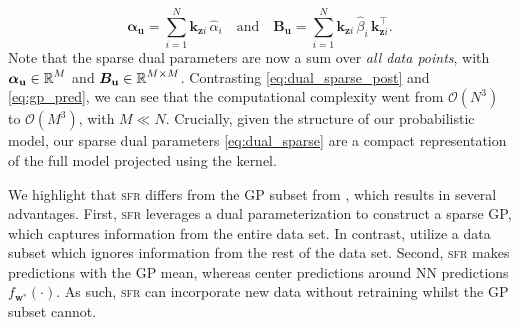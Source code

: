 \documentclass{article}
\newcommand{\our}{\textsc{sfr}\xspace}
\newcommand{\dataset}{\ensuremath{\mathcal{D}}}
\newcommand{\mathbold}[1]{\bm{#1}}
\newcommand{\mbf}[1]{\mathbf{#1}}
\newcommand{\T}{\top}
\newcommand{\valpha}[0]{\mathbold{\alpha}}
\newcommand{\MBeta}[0]{\mathbold{B}}
\newcommand{\vz}{\mbf{z}}
\newcommand{\vf}{\mbf{f}}
\newcommand{\vu}{\mbf{u}}
\newcommand{\vx}{\mbf{x}}
\newcommand{\vw}{\mbf{w}}
\newcommand{\MKzz}{\mbf{K}_{\mbf{z}\mbf{z}}}
\newcommand{\MKxx}{\mbf{K}_{\mbf{x}\mbf{x}}}
\newcommand{\vkzi}{\mbf{k}_{\mbf{z}i}}
\newcommand{\vkzs}{\mbf{k}_{\mbf{z}i}}
\newcommand{\vk}{\mbf{k}}
\newcommand{\myexpect}{\mathbb{E}}
\begin{document}
%
\begin{equation} \textstyle
  \valpha_{\vu}  =  \sum_{i=1}^N  \vkzi \, \hat{\alpha}_{i}
  \quad \text{and} \quad
  \MBeta_{\vu} =  \sum_{i=1}^N \vkzi \,\hat{\beta}_{i} \, \vkzi^{\T} .
\label{eq:dual_sparse}
\end{equation}
%
Note that the sparse dual parameters are now a sum over \emph{all data points}, with $\valpha_{\vu} \in \R^{M}$ and $\MBeta_{\vu} \in \R^{M  \times M}$.
Contrasting \cref{eq:dual_sparse_post} and \cref{eq:gp_pred}, we can see that the computational complexity went from $\mathcal{O}(N^3)$ to $\mathcal{O}(M^3)$, with $M \ll N$.
Crucially, given the structure of our probabilistic model, our sparse dual parameters \cref{eq:dual_sparse} are a compact representation of the full model projected using the kernel.





We highlight that \our differs from the GP subset from \citet{immer2021improving}, which results in several advantages.
First, \our leverages a dual parameterization to construct a sparse GP, which captures information from the entire data set.
In contrast, \citet{immer2021improving} utilize a data subset which ignores information from the rest of the data set.
Second, \our makes predictions with the GP mean, whereas \citet{immer2021improving} center predictions around NN predictions $f_{\vw^*}(\cdot)$.
As such, \our can incorporate new data without retraining whilst the GP subset cannot.
\end{document}
